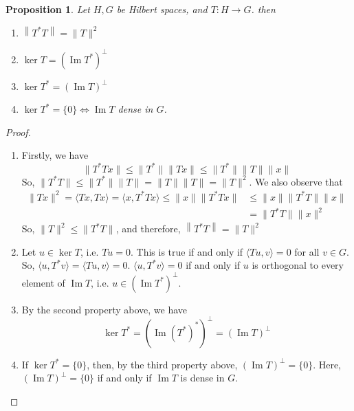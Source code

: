 \documentclass{report}
\newtheorem{prop}{Proposition}
\newcommand{\im}{\operatorname{Im}}
\begin{document}
\begin{prop} \label{Bdprops}
  Let $H, G$ be Hilbert spaces, and $T:H \rightarrow G$. then
  \begin{enumerate}
    \item $\left\|T^{*} T\right\|=\|T\|^{2}$
    \item $\operatorname{ker} T=\left(\operatorname{Im} T^{*}\right)^{\perp}$
    \item $\operatorname{ker} T^{*}=(\operatorname{Im}T)^{\perp}$
    \item $\operatorname{ker} T^{*}=\{0\} \Leftrightarrow \operatorname{Im} T$ dense in $G$.
  \end{enumerate}
\end{prop}
\begin{proof}
  \begin{enumerate}
    \item Firstly, we have
      $$
      \lVert T^{*}Tx\rVert\leq\lVert T^{*}\rVert\lVert Tx\rVert\leq\lVert T^{*}\rVert\lVert T\rVert\lVert x\rVert
      $$
      So, $\lVert T^{*}T\rVert\leq\lVert T^{*}\rVert\lVert T\rVert=\lVert T\rVert\lVert T\rVert = \lVert T\rVert^{2}$. We also observe that
      $$
      \begin{aligned}
        \lVert Tx\rVert^{2} = \langle Tx,Tx\rangle = \langle x,T^{*}Tx\rangle \leq \lVert x\rVert\lVert T^{*}Tx\rVert &\leq \lVert x\rVert\lVert T^{*}T\rVert\lVert x\rVert\\ &= \lVert T^{*}T\rVert\lVert x\rVert^{2}
      \end{aligned}
      $$
      So, $\lVert T\rVert^{2}\leq\lVert T^{*}T\rVert$, and therefore, $\left\|T^{*} T\right\|=\|T\|^{2}$
    \item Let $u\in\ker T$, i.e. $Tu=0$. This is true if and only if $\langle Tu,v\rangle=0$ for all $v\in G$. So, $\langle u,T^{*}v\rangle = \langle Tu,v\rangle = 0$. $\langle u,T^{*}v\rangle=0$ if and only if $u$ is orthogonal to every element of $\im T$, i.e. $u\in(\im T^{*})^{\perp}$.
    \item By the second property above, we have
      $$
      \ker T^{*} = (\im (T^{*})^{*})^{\perp} = (\im T)^{\perp}
      $$
    \item If $\ker T^{*} = \{0\}$, then, by the third property above, $(\im T)^{\perp} = \{0\}$. Here, $(\im T)^{\perp}=\{0\}$ if and only if $\im T$ is dense in $G$.
  \end{enumerate}
\end{proof}
\end{document}
